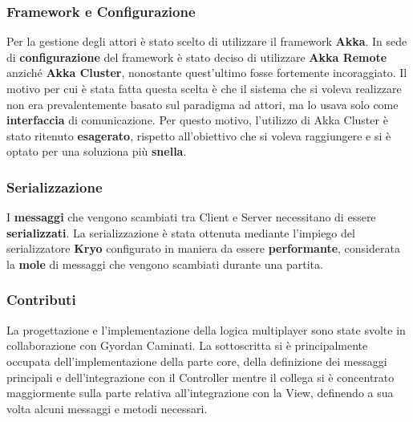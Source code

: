 \subsubsection{Framework e Configurazione}
Per la gestione degli attori è stato scelto di utilizzare il framework \textbf{Akka}. In sede di \textbf{configurazione} del framework è stato deciso di utilizzare \textbf{Akka Remote} anziché \textbf{Akka Cluster}, nonostante quest'ultimo fosse fortemente incoraggiato. Il motivo per cui è stata fatta questa scelta è che il sistema che si voleva realizzare non era prevalentemente basato sul paradigma ad attori, ma lo usava solo come \textbf{interfaccia} di comunicazione. Per questo motivo, l'utilizzo di Akka Cluster è stato ritenuto \textbf{esagerato}, rispetto all'obiettivo che si voleva raggiungere e si è optato per una soluziona più \textbf{snella}.

\subsubsection{Serializzazione}
I \textbf{messaggi} che vengono scambiati tra Client e Server necessitano di essere \textbf{serializzati}. La serializzazione è stata ottenuta mediante l'impiego del serializzatore \textbf{Kryo} configurato in maniera da essere \textbf{performante}, considerata la \textbf{mole} di messaggi che vengono scambiati durante una partita.  

\subsubsection{Contributi}
La progettazione e l'implementazione della logica multiplayer sono state svolte in collaborazione con Gyordan Caminati. La sottoscritta si è principalmente occupata dell'implementazione della parte core, della definizione dei messaggi principali e dell'integrazione con il Controller mentre il collega si è concentrato maggiormente sulla parte relativa all'integrazione con la View, definendo a sua volta alcuni messaggi e metodi necessari.

